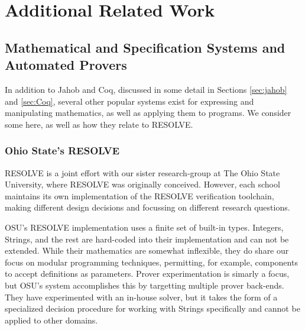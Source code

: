 \section{Additional Related Work}\label{sect:relatedWork}

\subsection{Mathematical and Specification Systems and Automated Provers}\label{sec:mathandspecsystems}
In addition to Jahob and Coq, discussed in some detail in Sections \ref{sec:jahob} and \ref{sec:Coq}, several other popular systems exist for expressing and manipulating mathematics, as well as applying them to programs.  We consider some here, as well as how they relate to RESOLVE.

\subsubsection{Ohio State's RESOLVE}\label{sec:OSURESOLVE}
RESOLVE is a joint effort with our sister research-group at The Ohio State University, where RESOLVE was originally conceived.  However, each school maintains its own implementation of the RESOLVE verification toolchain, making different design decisions and focussing on different research questions.

OSU's RESOLVE implementation uses a finite set of built-in types.  Integers, Strings, and the rest are hard-coded into their implementation and can not be extended.  While their mathematics are somewhat inflexible, they do share our focus on modular programming techniques, permitting, for example, components to accept definitions as parameters.  Prover experimentation is simarly a focus, but OSU's system accomplishes this by targetting multiple prover back-ends.  They have experimented with an in-house solver, but it takes the form of a specialized decision procedure for working with Strings specifically and cannot be applied to other domains.

